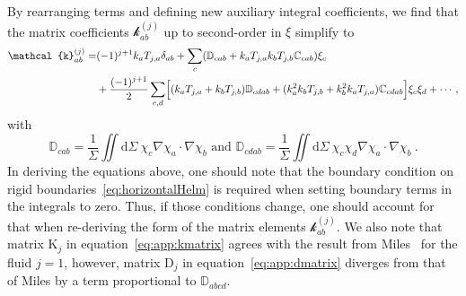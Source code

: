 \documentclass[a4paper]{jpconf}
\newcommand{\pow}[2]{#1^{(#2)}}
\newcommand{\dd}{\mathrm{d}}
\begin{document}
By rearranging terms and defining new auxiliary integral coefficients, we find that the matrix coefficients $\pow{\mathcal{k}}{j}_{ab}$ up to second-order in $\xi$ simplify to 
\begin{equation}
\begin{aligned}
\label{eq:app:kmatrix}
    \pow{\mathcal{k}}{j}_{ab}=
    &(-1)^{j+1}k_a T_{j,a} \delta_{ab} 
    +\sum_c(\mathbb{D}_{cab}+k_aT_{j,a} k_b T_{j,b} \mathbb{C}_{cab})\xi_c\\
    &+\frac{(-1)^{j+1}}{2}\sum_{c,d} \Bigl[(k_aT_{j,a}+k_bT_{j,b})\mathbb{D}_{cdab}+(k_a^2k_bT_{j,b}+k_b^2k_aT_{j,a})\mathbb{C}_{cdab}\Bigl]\xi_c\xi_d
    +\cdots,
\end{aligned}
\end{equation}
with
\begin{equation}
    \mathbb{D}_{cab} = \frac{1}{\Sigma}\iint \dd \Sigma~ \chi_c\nabla\chi_a\cdot\nabla\chi_b\text{ and } \mathbb{D}_{cdab} = \frac{1}{\Sigma}\iint \dd \Sigma~ \chi_c\chi_d\nabla\chi_a\cdot\nabla\chi_b~.
\end{equation}
In deriving the equations above, one should note that the boundary condition on rigid boundaries~\eqref{eq:horizontalHelm} is required when setting boundary terms in the integrals to zero. Thus, if those conditions change, one should account for that when re-deriving the form of the matrix elements $\pow{\mathcal{k}}{j}_{ab}$. We also note that matrix $\bm{\mathrm{K}}_j$ in equation~\eqref{eq:app:kmatrix} agrees with the result from Miles~\cite{Miles1976NonlinearBasins} for the fluid $j=1$, however, matrix $\bm{\mathrm{D}}_j$ in equation~\eqref{eq:app:dmatrix} diverges from that of Miles by a term proportional to $\mathbb{D}_{abcd}$.
\end{document}
